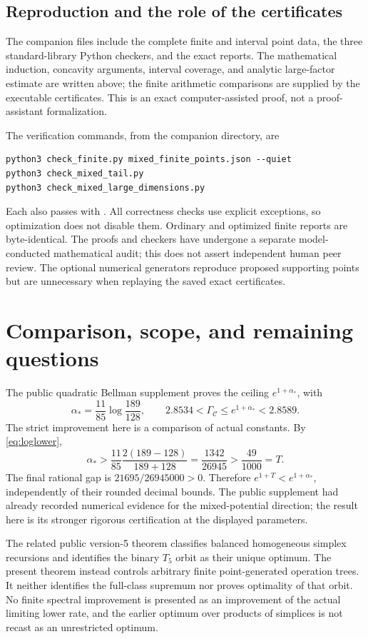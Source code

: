 \documentclass[11pt]{article}
\theoremstyle{remark}
\newcommand{\CC}{\mathcal C}
\newcommand{\code}[1]{\texttt{\detokenize{#1}}}
\begin{document}
\subsection{Reproduction and the role of the certificates}

The companion files include the complete finite and interval point data, the three standard-library Python checkers, and the exact reports. The mathematical induction, concavity arguments, interval coverage, and analytic large-factor estimate are written above; the finite arithmetic comparisons are supplied by the executable certificates. This is an exact computer-assisted proof, not a proof-assistant formalization.

The verification commands, from the companion directory, are
\begin{verbatim}
python3 check_finite.py mixed_finite_points.json --quiet
python3 check_mixed_tail.py
python3 check_mixed_large_dimensions.py
\end{verbatim}
Each also passes with \code{python3 -O}. All correctness checks use explicit exceptions, so optimization does not disable them. Ordinary and optimized finite reports are byte-identical. The proofs and checkers have undergone a separate model-conducted mathematical audit; this does not assert independent human peer review. The optional numerical generators reproduce proposed supporting points but are unnecessary when replaying the saved exact certificates.

\section{Comparison, scope, and remaining questions}\label{sec:comparison}

The public quadratic Bellman supplement \cite{quadratic} proves the ceiling $e^{1+\alpha_*}$, with
\[
 \alpha_* =\frac{11}{85}\log\frac{189}{128},\qquad
 2.8534<\Gamma_{\CC}\le e^{1+\alpha_*}<2.8589.
\]
The strict improvement here is a comparison of actual constants. By \eqref{eq:loglower},
\[
 \alpha_* >\frac{11}{85}\frac{2(189-128)}{189+128}
 =\frac{1342}{26945}>\frac{49}{1000}=T.
\]
The final rational gap is $21695/26945000>0$. Therefore $e^{1+T}<e^{1+\alpha_*}$, independently of their rounded decimal bounds. The public supplement had already recorded numerical evidence for the mixed-potential direction; the result here is its stronger rigorous certification at the displayed parameters.

The related public version-5 theorem \cite{balanced} classifies balanced homogeneous simplex recursions and identifies the binary $T_5$ orbit as their unique optimum. The present theorem instead controls arbitrary finite point-generated operation trees. It neither identifies the full-class supremum nor proves optimality of that orbit. No finite spectral improvement is presented as an improvement of the actual limiting lower rate, and the earlier optimum over products of simplices is not recast as an unrestricted optimum.
\end{document}
